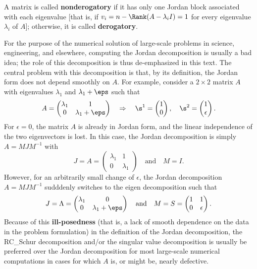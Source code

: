 A matrix is called {\bf nonderogatory} if it has only one Jordan block associated with each eigenvalue [that is, if $v_i=n-\Rank(A-\lambda_i I)=1$ for every eigenvalue $\lambda_i$ of $A$];
otherwise, it is called {\bf derogatory}.

For the purpose of the numerical solution of large-scale problems in
science, engineering, and elsewhere, computing the
Jordan decomposition is usually a bad idea; the role of this
decomposition is thus de-emphasized in this text.  The central problem with
this decomposition is that, by its definition, the Jordan form does
not depend smoothly on $A$.  For example, consider a $2\times 2$
matrix $A$ with eigenvalues $\lambda_{1}$ and $\lambda_{1}+\eps$ such
that
\begin{equation}
    A=\begin{pmatrix}
     \lambda_{1} & 1 \\ 0 & \lambda_{1}+\eps
    \end{pmatrix} \quad \Rightarrow \quad
    \s^{1}=\begin{pmatrix} 1 \\ 0 \end{pmatrix}, \quad \s^{2}=\begin{pmatrix} 1 \\ \epsilon \end{pmatrix}.
    \label{A1example}
\end{equation}
For $\epsilon=0$, the matrix $A$ is already in Jordan form, and the
linear independence of the two eigenvectors is lost.  In this case,
the Jordan decomposition is simply $A=MJM^{-1}$ with
\begin{equation*}
    J=A=\begin{pmatrix}
	 \lambda_{1} & 1 \\ 0 & \lambda_{1}
	\end{pmatrix}\quad \textrm{and} \quad M=I.
\end{equation*}
However, for an arbitrarily small change of $\epsilon$, the Jordan
decomposition $A=MJM^{-1}$ sudddenly switches to the eigen decomposition such that
\begin{equation*}
	J=\Lambda=\begin{pmatrix} \lambda_{1} & 0 \\ 0 & \lambda_{1}+\eps
	\end{pmatrix} \quad \textrm{and} \quad M=S =\begin{pmatrix} 1 &
	1 \\ 0 & \epsilon \end{pmatrix}.
\end{equation*}
Because of this {\bf ill-posedness} (that is, a lack of smooth
dependence on the data in the problem formulation) in the definition
of the Jordan decomposition, the RC_Schur decomposition and/or the
singular value decomposition is usually be preferred over the Jordan
decomposition for most large-scale numerical computations in cases for which $A$ is, or
might be, nearly defective.

